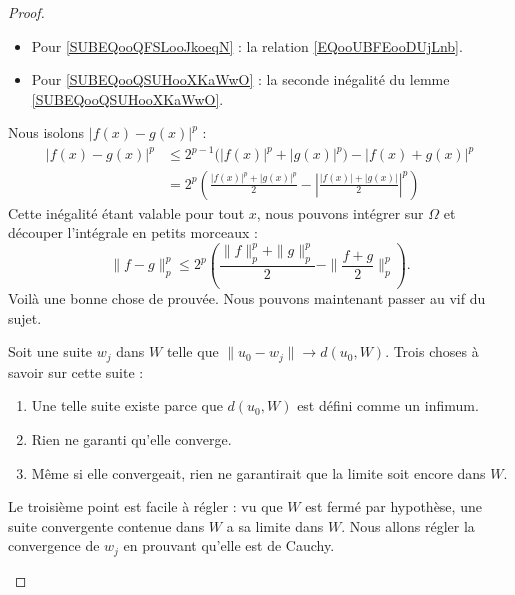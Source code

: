 \begin{proof}
\begin{subproof}
\begin{itemize}
            \item Pour \eqref{SUBEQooQFSLooJkoeqN} : la relation \eqref{EQooUBFEooDUjLnb}.
            \item Pour \eqref{SUBEQooQSUHooXKaWwO} : la seconde inégalité du lemme \ref{SUBEQooQSUHooXKaWwO}.
        \end{itemize}
        Nous isolons \( | f(x)-g(x) |^p\) :
        \begin{subequations}
            \begin{align}
                | f(x)-g(x) |^p & \leq 2^{p-1}\big( | f(x) |^p+| g(x) |^p \big)-| f(x)+g(x) |^p                                       \\
                                & =2^p\left( \frac{ | f(x) |^p+| g(x) |^p }{2}-\left| \frac{ | f(x) |+| g(x) | }{2} \right|^p \right)
            \end{align}
        \end{subequations}
        Cette inégalité étant valable pour tout \( x\), nous pouvons intégrer sur \( \Omega\) et découper l'intégrale en petits morceaux :
        \begin{equation}        \label{EQooVNHSooPXjFNC}
            \| f-g \|^p_p\leq 2^p\left( \frac{ \| f \|_p^p+\| g \|_p^p }{2}- \| \frac{ f+g }{2} \|_p^p \right).
        \end{equation}
        Voilà une bonne chose de prouvée. Nous pouvons maintenant passer au vif du sujet.

        Soit une suite \( w_j\) dans \( W\) telle que \( \| u_0-w_j \|\to d(u_0,W)\). Trois choses à savoir sur cette suite :
        \begin{enumerate}
            \item
                  Une telle suite existe parce que \( d(u_0,W)\) est défini comme un infimum.
            \item
                  Rien ne garanti qu'elle converge.
            \item
                  Même si elle convergeait, rien ne garantirait que la limite soit encore dans \( W\).
        \end{enumerate}
        Le troisième point est facile à régler : vu que \( W\) est fermé par hypothèse, une suite convergente contenue dans \( W\) a sa limite dans \( W\). Nous allons régler la convergence de \( w_j\) en prouvant qu'elle est de Cauchy.


\end{subproof}
\end{proof}
